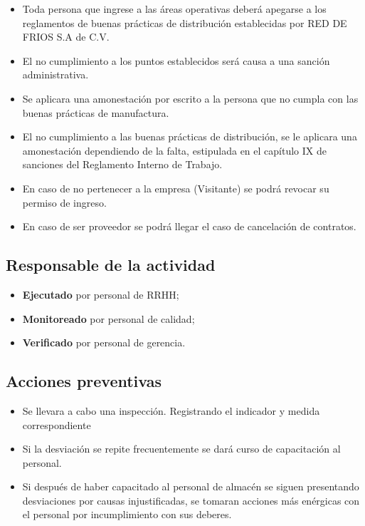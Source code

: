 \begin{itemize}
	\item Toda persona que ingrese a las áreas operativas deberá apegarse a los reglamentos de buenas prácticas de distribución establecidas por RED DE FRIOS S.A de C.V.
	\item El no cumplimiento a los puntos establecidos será causa a una sanción administrativa.
	\item Se aplicara una amonestación por escrito a la persona que no cumpla con las buenas prácticas de manufactura.
	\item El no cumplimiento a las buenas prácticas de distribución, se le aplicara una amonestación dependiendo de la falta, estipulada en el capítulo IX de sanciones del Reglamento Interno de Trabajo.
	\item En caso de no pertenecer a la empresa (Visitante) se podrá revocar su permiso de ingreso.
	\item En caso de ser proveedor se podrá llegar el caso de cancelación de contratos.
\end{itemize}

\subsection{Responsable de la actividad}

\begin{itemize}
	\item \textbf{Ejecutado} por personal de RRHH;
	\item \textbf{Monitoreado} por personal de calidad;
	\item \textbf{Verificado} por personal de gerencia.
\end{itemize}

\subsection{Acciones preventivas}

\begin{itemize}
	\item Se llevara a cabo una inspección. Registrando el indicador y medida correspondiente
	\item Si la desviación se repite frecuentemente se dará curso de capacitación al personal.
	\item Si después de haber capacitado al personal de almacén se siguen presentando desviaciones por causas injustificadas, se tomaran acciones más enérgicas con el personal por incumplimiento con sus deberes.
\end{itemize}

